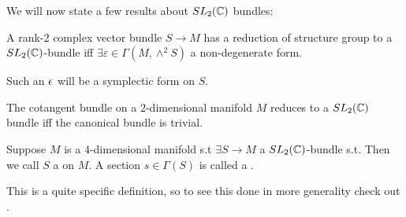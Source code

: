 \documentclass{article}
\begin{document}
We will now state a few results about $SL_2(\mathbb{C})$ bundles:
\begin{lemma}
	A rank-2 complex vector bundle $S \to M$ has a reduction of structure group to a $SL_2(\mathbb{C})$-bundle iff $\exists \varepsilon \in \Gamma(M,\wedge^2 S)$ a non-degenerate form. 
\end{lemma}

\begin{remark}
	Such an $\epsilon$ will be a symplectic form on $S$.
\end{remark}

\begin{corollary}
	The cotangent bundle on a 2-dimensional manifold $M$ reduces to a $SL_2(\mathbb{C})$ bundle iff the canonical bundle is trivial.  
\end{corollary}

\begin{definition}
	Suppose $M$ is a 4-dimensional manifold s.t $\exists S \to M$ a $SL_2(\mathbb{C})$-bundle s.t. 
Then we call $S$ a  on  $M$. A section $s \in \Gamma(S)$ is called a .   
\end{definition}

\begin{remark}
	This is a quite specific definition, so to see this done in more generality check out \cite{Michelsohn1989}. 
\end{remark}
\end{document}
